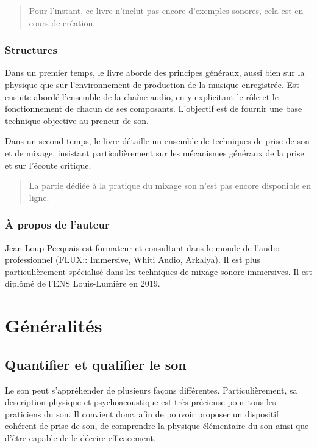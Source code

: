\documentclass[
]{book}
\begin{document}
\begin{quote}
Pour l'instant, ce livre n'inclut pas encore d'exemples sonores, cela est en cours de création.
\end{quote}

\hypertarget{structures}{%
\section{Structures}\label{structures}}

Dans un premier temps, le livre aborde des principes généraux, aussi bien sur la physique que sur l'environnement de production de la musique enregistrée. Est ensuite abordé l'ensemble de la chaîne audio, en y explicitant le rôle et le fonctionnement de chacun de ses composants. L'objectif est de fournir une base technique objective au preneur de son.

Dans un second temps, le livre détaille un ensemble de techniques de prise de son et de mixage, insistant particulièrement sur les mécanismes généraux de la prise et sur l'écoute critique.

\begin{quote}
La partie dédiée à la pratique du mixage son n'est pas encore disponible en ligne.
\end{quote}

\hypertarget{uxe0-propos-de-lauteur}{%
\section{À propos de l'auteur}\label{uxe0-propos-de-lauteur}}

Jean-Loup Pecquais est formateur et consultant dans le monde de l'audio professionnel (FLUX:: Immersive, Whiti Audio, Arkalya). Il est plus particulièrement spécialisé dans les techniques de mixage sonore immersives. Il est diplômé de l'ENS Louis-Lumière en 2019.

\hypertarget{part-guxe9nuxe9ralituxe9s}{%
\part{Généralités}\label{part-guxe9nuxe9ralituxe9s}}

\hypertarget{quantifier-et-qualifier-le-son}{%
\chapter{Quantifier et qualifier le son}\label{quantifier-et-qualifier-le-son}}

Le son peut s'appréhender de plusieurs façons différentes. Particulièrement, sa description physique et psychoacoustique est très précieuse pour tous les praticiens du son. Il convient donc, afin de pouvoir proposer un dispositif cohérent de prise de son, de comprendre la physique élémentaire du son ainsi que d'être capable de le décrire efficacement.
\end{document}
